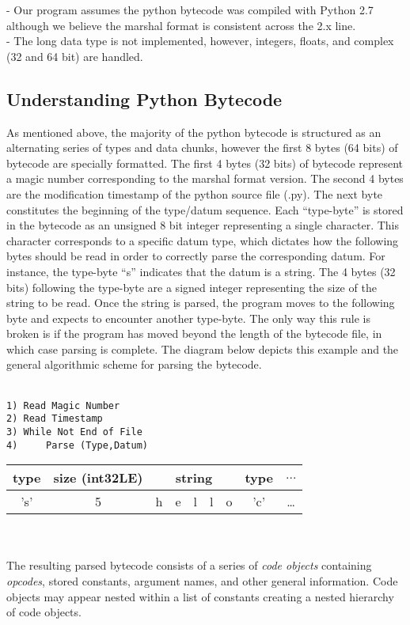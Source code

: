 \documentclass{article}
\begin{document}
- Our program assumes the python bytecode was compiled with Python 2.7 although we believe the marshal format is consistent across the 2.x line.\\
- The long data type is not implemented, however, integers, floats, and complex (32 and 64 bit) are handled.

\subsection{Understanding Python Bytecode}

As mentioned above, the majority of the python bytecode is structured as an alternating series of types and data chunks, however the first 8 bytes (64 bits) of bytecode are specially formatted.  The first 4 bytes (32 bits) of bytecode represent a magic number corresponding to the marshal format version.  The second 4 bytes are the modification timestamp of the python source file (.py).  The next byte constitutes the beginning of the type/datum sequence.  Each ``type-byte'' is stored in the bytecode as an unsigned 8 bit integer representing a single character.  This character corresponds to a specific datum type, which dictates how the following bytes should be read in order to correctly parse the corresponding datum.  For instance, the type-byte ``s'' indicates that the datum is a string.  The 4 bytes (32 bits) following the type-byte are a signed integer representing the size of the string to be read.  Once the string is parsed, the program moves to the following byte and expects to encounter another type-byte.  The only way this rule is broken is if the program has moved beyond the length of the bytecode file, in which case parsing is complete.  The diagram below depicts this example and the general algorithmic scheme for parsing the bytecode.\\
\\
\begin{minipage}{\textwidth}
\begin{minipage}{0.35\textwidth}
\begin{verbatim}
1) Read Magic Number
2) Read Timestamp
3) While Not End of File
4)     Parse (Type,Datum)
\end{verbatim}
\end{minipage}
\begin{minipage}{.64\textwidth}
\begin{tabular}{ c | c | c | c | c | c | c | c | c }
type & size (int32LE) & \multicolumn{5}{|c|}{string} & type & $\ldots$ \\ \hline
's' & 5 & h & e & l & l & o & 'c' & \ldots \\ \hline
\end{tabular}
\end{minipage}
\end{minipage}
\\\\
The resulting parsed bytecode consists of a series of {\em code objects} containing {\em opcodes}, stored constants, argument names, and other general information.  Code objects may appear nested within a list of constants creating a nested hierarchy of code objects.
\end{document}
